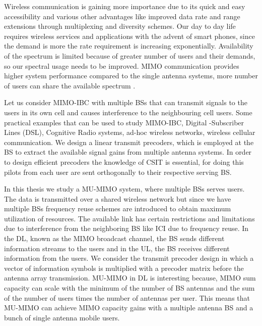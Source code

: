 \par
\thispagestyle{empty}

Wireless communication is gaining more importance due to its quick and easy accessibility and various other advantages like improved data rate and range extensions through multiplexing and diversity schemes. Our day to day life requires wireless services and applications with the advent of smart phones, since the demand is more the rate requirement is increasing exponentially. Availability of the spectrum is limited because of greater number of users and their demands, so our spectral usage needs to be improved. \ac{MIMO} communication provides higher system performance compared to the single antenna systems, more number of users can share the available spectrum \cite{alamouti1998simple}.

Let us consider \ac{MIMO}-\ac{IBC} with multiple \ac{BS}s that can transmit signals to the users in its own cell and causes interference to the neighbouring cell users. Some practical examples that can be used to study \ac{MIMO}-\ac{IBC}, Digital -Subscriber Lines (DSL), Cognitive Radio systems, ad-hoc wireless networks, wireless cellular communication.  We design a linear transmit precoders, which is employed at the \ac{BS} to extract the available signal gains from multiple antenna systems. In order to design efficient precoders the knowledge of \ac{CSIT} is essential, for doing this pilots from each user are sent orthogonally to their respective serving \ac{BS}.

In this thesis we study a \ac{MU-MIMO} system, where multiple \ac{BS}s serves users. The data is transmitted over a shared wireless network but since we have multiple \ac{BS}s frequency reuse schemes are introduced to obtain maximum utilization of resources. The available link has certain restrictions and limitations due to interference from the neighboring \ac{BS} like \ac{ICI} due to frequency reuse. In the \ac{DL}, known as the \ac{MIMO} broadcast channel, the \ac{BS} sends different information streams to the users and in the \ac{UL}, the \ac{BS} receives different information from the users. We consider the transmit precoder design in which a vector of information symbols is multiplied with a precoder matrix before the antenna array transmission. \ac{MU-MIMO} in \ac{DL} is interesting because, \ac{MIMO} sum capacity can scale with the minimum of the number of \ac{BS} antennas and the sum of the number of users times the number of antennas per user. This means that \ac{MU-MIMO} can achieve \ac{MIMO} capacity gains with a multiple antenna \ac{BS} and a bunch of single antenna mobile users.

